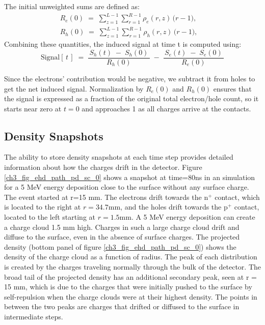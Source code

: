 The initial unweighted sums are defined as:
\begin{align}
R_{e}(0) \;=\; \sum_{z=1}^{L-1} \sum_{r=1}^{R-1}
   \rho_e(r,z)\,\bigl(r-1\bigr), \quad \\
R_{h}(0) \;=\; \sum_{z=1}^{L-1} \sum_{r=1}^{R-1}
   \rho_h(r,z)\,\bigl(r-1\bigr), \quad
\end{align}
\noindent
Combining these quantities, the induced signal at time t is computed using:
\begin{equation}
\text{Signal}[\,t\,] 
\;=\;
  \frac{\,S_h(t)\;-\;S_h(0)\,}{\,R_{h}(0)\,}
  \;-\;
  \frac{\,S_e(t)\;-\;S_e(0)\,}{\,R_{e}(0)\,}
\label{eq:net-signal}
\end{equation}

\noindent
Since the electrons' contribution would be negative, we subtract it from holes to get the net induced signal. Normalization by $R_{e}(0)$ and $R_{h}(0)$ ensures that the signal is expressed as a fraction of the original total electron/hole count, so it starts near zero at $t=0$ and approaches 1 as all charges arrive at the contacts.

\subsection{Density Snapshots}
The ability to store density snapshots at each time step provides detailed information about how the charges drift in the detector. Figure \ref{ch3_fig_ehd_path_pd_sc_0} shows a snapshot at time=$80$ns in an {\ehd} simulation for a 5 MeV energy deposition close to the surface without any surface charge. The event started at r=15 mm. The electrons drift towards the n$^+$ contact, which is located to the right at $r=34.7$mm, and the holes drift towards the p$^+$ contact, located to the left starting at $r=1.5$mm. A 5 MeV energy deposition can create a charge cloud 1.5 mm high. Charges in such a large charge cloud drift and diffuse to the surface, even in the absence of surface charges. The projected density (bottom panel of figure \ref{ch3_fig_ehd_path_pd_sc_0}) shows the density of the charge cloud as a function of radius. The peak of each distribution is created by the charges traveling normally through the bulk of the detector. The broad tail of the projected density has an additional secondary peak, seen at r = 15 mm, which is due to the charges that were initially pushed to the surface by self-repulsion when the charge clouds were at their highest density. The points in between the two peaks are charges that drifted or diffused to the surface in intermediate steps. 

